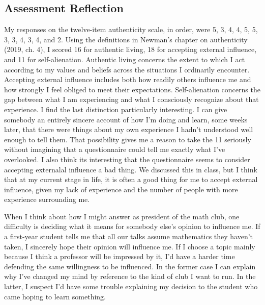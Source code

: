\documentclass[12pt,letterpaper]{article}
\begin{document}
\subsection{Assessment Reflection}
My responses on the twelve-item authenticity scale, in order, were 5, 3, 4, 4, 5, 5, 3, 3, 4, 3, 4, and 2. Using the definitions in Newman's chapter on authenticity (2019, ch. 4), I scored 16 for authentic living, 18 for accepting external influence, and 11 for self-alienation. Authentic living concerns the extent to which I act according to my values and beliefs across the situations I ordinarily encounter. Accepting external influence includes both how readily others influence me and how strongly I feel obliged to meet their expectations. Self-alienation concerns the gap between what I am experiencing and what I consciously recognize about that experience. I find the last distinction particularly interesting. I can give somebody an entirely sincere account of how I'm doing and learn, some weeks later, that there were things about my own experience I hadn't understood well enough to tell them. That possibility gives me a reason to take the 11 seriously without imagining that a questionnaire could tell me exactly what I've overlooked.
I also think its interesting that the questionnaire seems to consider accepting externalal influence a bad thing.
We discussed this in class, but I think that at my current stage in life, it is often a good thing for me to accept external influence, given my lack of experience and the number of people with more experience surrounding me.

When I think about how I might answer as president of the math club, one difficulty is deciding what it means for somebody else's opinion to influence me. If a first-year student tells me that all our talks assume mathematics they haven't taken, I sincerely hope their opinion will influence me. If I choose a topic mainly because I think a professor will be impressed by it, I'd have a harder time defending the same willingness to be influenced. In the former case I can explain why I've changed my mind by reference to the kind of club I want to run. In the latter, I suspect I'd have some trouble explaining my decision to the student who came hoping to learn something.
\end{document}
